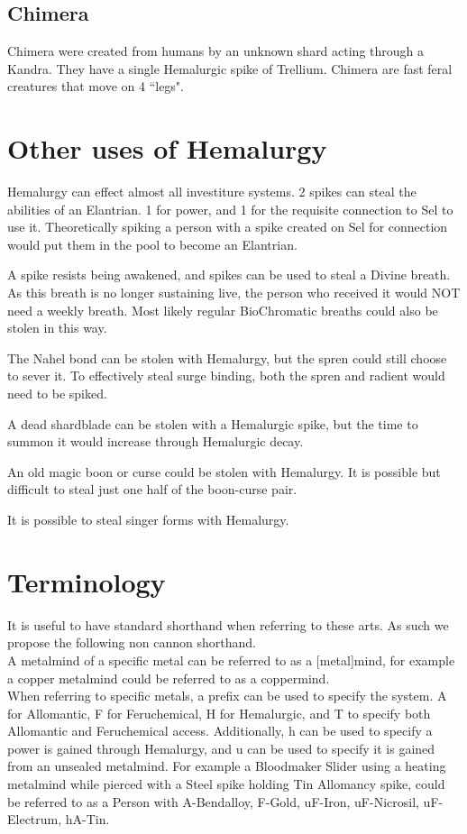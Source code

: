 \documentclass[conference]{IEEEtran}
\begin{document}
\subsection*{Chimera}
Chimera were created from humans by an unknown shard acting through a Kandra.  They have a single Hemalurgic spike of Trellium.
Chimera are fast feral creatures that move on 4 ``legs".

\section*{Other uses of Hemalurgy}
Hemalurgy can effect almost all investiture systems.  2 spikes can steal the abilities of an Elantrian.  1 for power, and 1 for the requisite connection to Sel to use it.  Theoretically spiking a person with a spike created on Sel for connection would put them in the pool to become an Elantrian.

A spike resists being awakened, and spikes can be used to steal a Divine breath.  As this breath is no longer sustaining live, the person who received it would NOT need a weekly breath.  Most likely regular BioChromatic breaths could also be stolen in this way.

The Nahel bond can be stolen with Hemalurgy, but the spren could still choose to sever it.  To effectively steal surge binding, both the spren and radient would need to be spiked.

A dead shardblade can be stolen with a Hemalurgic spike, but the time to summon it would increase through Hemalurgic decay.

An old magic boon or curse could be stolen with Hemalurgy.  It is possible but difficult to steal just one half of the boon-curse pair.

It is possible to steal singer forms with Hemalurgy. 

\section*{Terminology}
It is useful to have standard shorthand when referring to these arts.  As such we propose the following non cannon shorthand.\\

A metalmind of a specific metal can be referred to as a [metal]mind, for example a copper metalmind could be referred to as a coppermind.\\

When referring to specific metals, a prefix can be used to specify the system.  A for Allomantic, F for Feruchemical, H for Hemalurgic, and T to specify both Allomantic and Feruchemical access.  Additionally, h can be used to specify a power is gained through Hemalurgy, and u can be used to specify it is gained from an unsealed metalmind.  For example a Bloodmaker Slider using a heating metalmind while pierced with a Steel spike holding Tin Allomancy spike, could be referred to as a Person with A-Bendalloy, F-Gold, uF-Iron, uF-Nicrosil, uF-Electrum, hA-Tin.  
\end{document}

